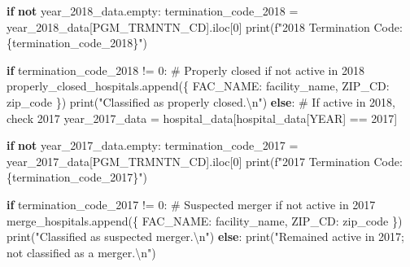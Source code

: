 \documentclass[
  letterpaper,
  DIV=11,
  numbers=noendperiod]{scrartcl}
\newenvironment{Shaded}{\begin{snugshade}}{\end{snugshade}}
\newcommand{\BuiltInTok}[1]{\textcolor[rgb]{0.00,0.23,0.31}{#1}}
\newcommand{\CharTok}[1]{\textcolor[rgb]{0.13,0.47,0.30}{#1}}
\newcommand{\CommentTok}[1]{\textcolor[rgb]{0.37,0.37,0.37}{#1}}
\newcommand{\ControlFlowTok}[1]{\textcolor[rgb]{0.00,0.23,0.31}{\textbf{#1}}}
\newcommand{\DecValTok}[1]{\textcolor[rgb]{0.68,0.00,0.00}{#1}}
\newcommand{\KeywordTok}[1]{\textcolor[rgb]{0.00,0.23,0.31}{\textbf{#1}}}
\newcommand{\NormalTok}[1]{\textcolor[rgb]{0.00,0.23,0.31}{#1}}
\newcommand{\OperatorTok}[1]{\textcolor[rgb]{0.37,0.37,0.37}{#1}}
\newcommand{\SpecialCharTok}[1]{\textcolor[rgb]{0.37,0.37,0.37}{#1}}
\newcommand{\SpecialStringTok}[1]{\textcolor[rgb]{0.13,0.47,0.30}{#1}}
\newcommand{\StringTok}[1]{\textcolor[rgb]{0.13,0.47,0.30}{#1}}
\begin{document}
\begin{Shaded}
\begin{Highlighting}[]
        \ControlFlowTok{if} \KeywordTok{not}\NormalTok{ year\_2018\_data.empty:}
\NormalTok{            termination\_code\_2018 }\OperatorTok{=}\NormalTok{ year\_2018\_data[}\StringTok{\textquotesingle{}PGM\_TRMNTN\_CD\textquotesingle{}}\NormalTok{].iloc[}\DecValTok{0}\NormalTok{]}
            \BuiltInTok{print}\NormalTok{(}\SpecialStringTok{f"2018 Termination Code: }\SpecialCharTok{\{}\NormalTok{termination\_code\_2018}\SpecialCharTok{\}}\SpecialStringTok{"}\NormalTok{)}
            
            \ControlFlowTok{if}\NormalTok{ termination\_code\_2018 }\OperatorTok{!=} \DecValTok{0}\NormalTok{:}
                \CommentTok{\# Properly closed if not active in 2018}
\NormalTok{                properly\_closed\_hospitals.append(\{}
                    \StringTok{\textquotesingle{}FAC\_NAME\textquotesingle{}}\NormalTok{: facility\_name,}
                    \StringTok{\textquotesingle{}ZIP\_CD\textquotesingle{}}\NormalTok{: zip\_code}
\NormalTok{                \})}
                \BuiltInTok{print}\NormalTok{(}\StringTok{"Classified as properly closed.}\CharTok{\textbackslash{}n}\StringTok{"}\NormalTok{)}
            \ControlFlowTok{else}\NormalTok{:}
                \CommentTok{\# If active in 2018, check 2017}
\NormalTok{                year\_2017\_data }\OperatorTok{=}\NormalTok{ hospital\_data[hospital\_data[}\StringTok{\textquotesingle{}YEAR\textquotesingle{}}\NormalTok{] }\OperatorTok{==} \DecValTok{2017}\NormalTok{]}
                
                \ControlFlowTok{if} \KeywordTok{not}\NormalTok{ year\_2017\_data.empty:}
\NormalTok{                    termination\_code\_2017 }\OperatorTok{=}\NormalTok{ year\_2017\_data[}\StringTok{\textquotesingle{}PGM\_TRMNTN\_CD\textquotesingle{}}\NormalTok{].iloc[}\DecValTok{0}\NormalTok{]}
                    \BuiltInTok{print}\NormalTok{(}\SpecialStringTok{f"2017 Termination Code: }\SpecialCharTok{\{}\NormalTok{termination\_code\_2017}\SpecialCharTok{\}}\SpecialStringTok{"}\NormalTok{)}
                    
                    \ControlFlowTok{if}\NormalTok{ termination\_code\_2017 }\OperatorTok{!=} \DecValTok{0}\NormalTok{:}
                        \CommentTok{\# Suspected merger if not active in 2017}
\NormalTok{                        merge\_hospitals.append(\{}
                            \StringTok{\textquotesingle{}FAC\_NAME\textquotesingle{}}\NormalTok{: facility\_name,}
                            \StringTok{\textquotesingle{}ZIP\_CD\textquotesingle{}}\NormalTok{: zip\_code}
\NormalTok{                        \})}
                        \BuiltInTok{print}\NormalTok{(}\StringTok{"Classified as suspected merger.}\CharTok{\textbackslash{}n}\StringTok{"}\NormalTok{)}
                    \ControlFlowTok{else}\NormalTok{:}
                        \BuiltInTok{print}\NormalTok{(}\StringTok{"Remained active in 2017; not classified as a merger.}\CharTok{\textbackslash{}n}\StringTok{"}\NormalTok{)}


\end{Highlighting}
\end{Shaded}
\end{document}
